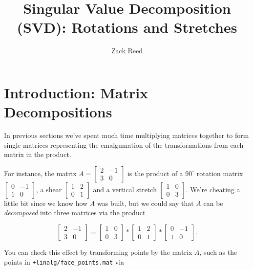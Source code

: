 \documentclass{ximera}
\author{Zack Reed}
\title{Singular Value Decomposition (SVD): Rotations and Stretches}
\begin{document}
\begin{abstract}

\end{abstract}
\maketitle

\section*{Introduction: Matrix Decompositions}
In previous sections we've spent much time multiplying matrices together to form single matrices representing the emalgumation of the transformations from each matrix in the product. 

For instance, the matrix $A=\begin{bmatrix} 2 & -1 \\ 3 & 0\end{bmatrix}$ is the product of a $90^\circ$ rotation matrix $\begin{bmatrix}0 & -1\\ 1 & 0\end{bmatrix}$, a shear $\begin{bmatrix} 1 & 2 \\ 0 & 1\end{bmatrix}$ and a vertical stretch $\begin{bmatrix} 1 & 0 \\ 0 & 3\end{bmatrix}$. We're cheating a little bit since we know how $A$ was built, but we could say that $A$ can be \emph{decomposed} into three matrices via the product 

$$\begin{bmatrix} 2 & -1 \\ 3 & 0\end{bmatrix}=\begin{bmatrix} 1 & 0 \\ 0 & 3\end{bmatrix}*\begin{bmatrix} 1 & 2 \\ 0 & 1\end{bmatrix}*\begin{bmatrix}0 & -1\\ 1 & 0\end{bmatrix}.$$

You can check this effect by transforming points by the matrix $A$, such as the points in \texttt{+linalg/face\_points.mat} via
\end{document}
